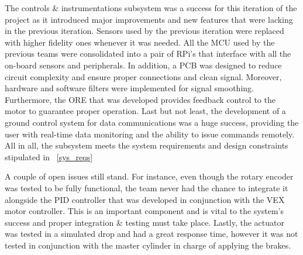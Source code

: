 
\indent\indent The controls \& instrumentations subsystem was a success for this iteration of the project as it introduced major improvements and new features that were lacking in the previous iteration. Sensors used by the previous iteration were replaced with higher fidelity ones whenever it was needed. All the MCU used by the previous teams were consolidated into a pair of RPi's that interface with all the on-board sensors and peripherals. In addition, a PCB was designed to reduce circuit complexity and ensure proper connections and clean signal. Moreover, hardware and software filters were implemented for signal smoothing. Furthermore, the ORE that was developed provides feedback control to the motor to guarantee proper operation. Last but not least, the development of a ground control system for data communications was a huge success, providing the user with real-time data monitoring and the ability to issue commands remotely.
All in all, the subsystem meets the system requirements and design constraints stipulated in ~\ref{sys_reqs}

A couple of open issues still stand. For instance, even though the rotary encoder was tested to be fully functional, the team never had the chance to integrate it alongside the PID controller that was developed in conjunction with the VEX motor controller. This is an important component and is vital to the system's success and proper integration \& testing must take place. Lastly, the actuator was tested in a simulated drop and had a great response time, however it was not tested in conjunction with the master cylinder in charge of applying the brakes.